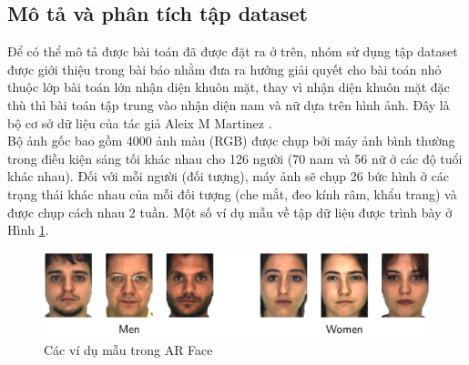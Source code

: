 \documentclass[a4paper, 12pt, oneside]{report}
\begin{document}
\subsection{Mô tả và phân tích tập dataset}
Để có thể mô tả được bài toán đã được đặt ra ở trên, nhóm sử dụng tập dataset được giới thiệu trong bài báo \cite{machinelearningcoban} nhằm đưa ra hướng giải quyết cho bài toán nhỏ thuộc lớp bài toán lớn nhận diện khuôn mặt, thay vì nhận diện khuôn mặt đặc thù thì bài toán tập trung vào nhận diện nam và nữ dựa trên hình ảnh. Đây là bộ cơ sở dữ liệu của tác giả Aleix M Martinez \cite{machinelearningcoban}. \\ 
Bộ ảnh gốc bao gồm 4000 ảnh màu (RGB) được chụp bởi máy ảnh bình thường trong điều kiện sáng tối khác nhau cho 126 người (70 nam và 56 nữ ở các độ tuổi khác nhau).  Đối với mỗi người (đối tượng), máy ảnh sẽ chụp 26 bức hình ở các trạng thái khác nhau của mỗi đối tượng (che mắt, đeo kính râm, khẩu trang) và được chụp cách nhau 2 tuần. Một số ví dụ mẫu về tập dữ liệu được trình bày ở Hình \ref{Hình 5.11}.
\begin{center}
    \begin{figure}[H]
    \begin{center}
     \includegraphics[scale=0.05]{ARgender_men.png}
    \end{center}
    \caption{Các ví dụ mẫu trong AR Face}
    \label{Hình 5.11}
    \end{figure}
\end{center}
\end{document}
